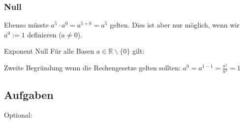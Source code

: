 \newpage



\subsubsection{Null}

Ebenso müsste $a^5 \cdot a^0 = a^{5+0} = a^5$ gelten. Dies ist aber
nur möglich, wenn wir $a^0 := 1$ definieren ($a\ne 0$).

\begin{definition}{Exponent Null}{} Für alle Basen $a \in \mathbb{R}\backslash\{0\}$ gilt:
\begin{center}
\end{center}
\end{definition}

Zweite Begründung wenn die Rechengesetze gelten sollten: $a^0 = a^{1-1} = \frac{a^1}{a^1} = 1$


 




\subsection{Aufgaben}



Optional: 
\newpage
